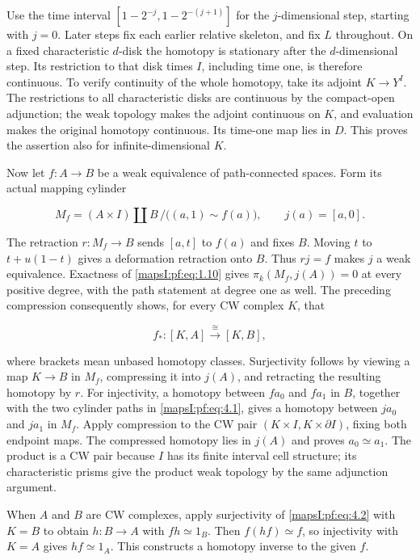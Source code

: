 Use the time interval \([1-2^{-j},1-2^{-(j+1)}]\) for the \(j\)-dimensional step, starting with \(j=0\). Later steps fix each earlier relative skeleton, and fix \(L\) throughout. On a fixed characteristic \(d\)-disk the homotopy is stationary after the \(d\)-dimensional step. Its restriction to that disk times \(I\), including time one, is therefore continuous. To verify continuity of the whole homotopy, take its adjoint \(K\to Y^I\). The restrictions to all characteristic disks are continuous by the compact-open adjunction; the weak topology makes the adjoint continuous on \(K\), and evaluation makes the original homotopy continuous. Its time-one map lies in \(D\). This proves the assertion also for infinite-dimensional \(K\).

Now let \(f:A\to B\) be a weak equivalence of path-connected spaces. Form its actual mapping cylinder

\begin{equation}
M_f=(A\times I)\amalg B\,/\bigl((a,1)\sim f(a)\bigr),
\qquad j(a)=[a,0].
\label{mapsI:pf:eq:4.1}
\end{equation}

The retraction \(r:M_f\to B\) sends \([a,t]\) to \(f(a)\) and fixes \(B\). Moving \(t\) to \(t+u(1-t)\) gives a deformation retraction onto \(B\). Thus \(rj=f\) makes \(j\) a weak equivalence. Exactness of \eqref{mapsI:pf:eq:1.10} gives \(\pi_k(M_f,j(A))=0\) at every positive degree, with the path statement at degree one as well. The preceding compression consequently shows, for every CW complex \(K\), that

\begin{equation}
f_*:[K,A]\xrightarrow{\ \cong\ }[K,B],
\label{mapsI:pf:eq:4.2}
\end{equation}

where brackets mean unbased homotopy classes. Surjectivity follows by viewing a map \(K\to B\) in \(M_f\), compressing it into \(j(A)\), and retracting the resulting homotopy by \(r\). For injectivity, a homotopy between \(f a_0\) and \(f a_1\) in \(B\), together with the two cylinder paths in \eqref{mapsI:pf:eq:4.1}, gives a homotopy between \(j a_0\) and \(j a_1\) in \(M_f\). Apply compression to the CW pair \((K\times I,K\times\partial I)\), fixing both endpoint maps. The compressed homotopy lies in \(j(A)\) and proves \(a_0\simeq a_1\). The product is a CW pair because \(I\) has its finite interval cell structure; its characteristic prisms give the product weak topology by the same adjunction argument.

When \(A\) and \(B\) are CW complexes, apply surjectivity of \eqref{mapsI:pf:eq:4.2} with \(K=B\) to obtain \(h:B\to A\) with \(fh\simeq1_B\). Then \(f(hf)\simeq f\), so injectivity with \(K=A\) gives \(hf\simeq1_A\). This constructs a homotopy inverse to the given \(f\).

